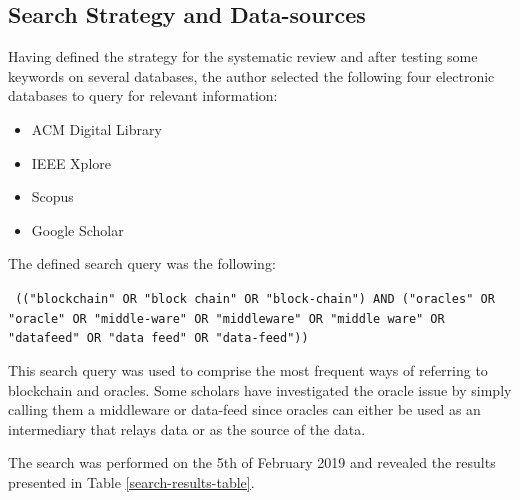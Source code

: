 \documentclass[final,3p,12pt,twocolumn]{elsarticle}
\begin{document}
\subsection{Search Strategy and Data-sources}
Having defined the strategy for the systematic review and after testing some keywords on several databases, the author selected the following four electronic databases to query for relevant information:

\begin{itemize}
  \item ACM Digital Library
  \item IEEE Xplore
  \item Scopus
  \item Google Scholar
\end{itemize}

The defined search query was the following:

\texttt{
  (("blockchain" OR "block chain" OR "block-chain")
  AND
  ("oracles" OR "oracle" OR "middle-ware" OR "middleware" OR "middle ware" OR "datafeed" OR "data feed" OR "data-feed"))
}

This search query was used to comprise the most frequent ways of referring to blockchain and oracles. Some scholars have investigated the oracle issue by simply calling them a middleware or data-feed since oracles can either be used as an intermediary that relays data or as the source of the data.

The search was performed on the 5th of February 2019 and revealed the results presented in Table \ref{search-results-table}.

\begin{table}[h]
  \begin{minipage}[c]{\textwidth}
    \centering
    \caption{Number of results and applied filters per database}
    \label{search-results-table}
  \end{minipage}
\end{table}
\end{document}
